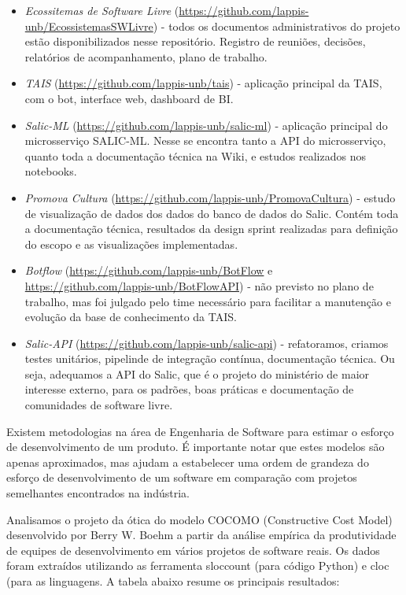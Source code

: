 \begin{itemize}
\item
  \emph{Ecossitemas de Software Livre}
  (\url{https://github.com/lappis-unb/EcossistemasSWLivre}) - todos os
  documentos administrativos do projeto estão disponibilizados nesse
  repositório. Registro de reuniões, decisões, relatórios de
  acompanhamento, plano de trabalho.
\item
  \emph{TAIS} (\url{https://github.com/lappis-unb/tais}) - aplicação
  principal da TAIS, com o bot, interface web, dashboard de BI.
\item
  \emph{Salic-ML} (\url{https://github.com/lappis-unb/salic-ml}) -
  aplicação principal do microsserviço SALIC-ML. Nesse se encontra tanto
  a API do microsserviço, quanto toda a documentação técnica na Wiki, e
  estudos realizados nos notebooks.
\item
  \emph{Promova Cultura}
  (\url{https://github.com/lappis-unb/PromovaCultura}) - estudo de
  visualização de dados dos dados do banco de dados do Salic. Contém
  toda a documentação técnica, resultados da design sprint realizadas
  para definição do escopo e as visualizações implementadas.
\item
  \emph{Botflow} (\url{https://github.com/lappis-unb/BotFlow} e
  \url{https://github.com/lappis-unb/BotFlowAPI}) - não previsto no
  plano de trabalho, mas foi julgado pelo time necessário para facilitar
  a manutenção e evolução da base de conhecimento da TAIS.
\item
  \emph{Salic-API} (\url{https://github.com/lappis-unb/salic-api}) -
  refatoramos, criamos testes unitários, pipelinde de integração
  contínua, documentação técnica. Ou seja, adequamos a API do Salic, que
  é o projeto do ministério de maior interesse externo, para os padrões,
  boas práticas e documentação de comunidades de software livre.
\end{itemize}

Existem metodologias na área de Engenharia de Software para estimar o
esforço de desenvolvimento de um produto. É importante notar que estes
modelos são apenas aproximados, mas ajudam a estabelecer uma ordem de
grandeza do esforço de desenvolvimento de um software em comparação com
projetos semelhantes encontrados na indústria.

Analisamos o projeto da ótica do modelo COCOMO (Constructive Cost Model)
desenvolvido por Berry W. Boehm a partir da análise empírica da
produtividade de equipes de desenvolvimento em vários projetos de
software reais. Os dados foram extraídos utilizando as ferramenta
sloccount (para código Python) e cloc (para as linguagens. A tabela
abaixo resume os principais resultados:

